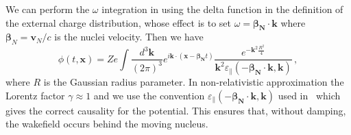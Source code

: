We can perform the $\omega$ integration in  using the delta function in the definition of the external charge distribution, whose effect is to set $\omega = \boldsymbol{\beta_{\text{N}}}\cdot \boldsymbol{k}$ where $\boldsymbol{\beta}_N = \boldsymbol{v}_N/c$ is the nuclei velocity. Then we have
\begin{equation}\label{eq:potentk}
 \phi(t,\boldsymbol{x}) = Ze\int \frac{d^3\boldsymbol{k}}{(2\pi)^3} e^{ i\boldsymbol{k}\cdot(\boldsymbol{x}-\boldsymbol{\beta_{\text{N}}} t)} \frac{ e^{-\boldsymbol{k}^2\frac{R^2}{4}}}{\boldsymbol{k}^2\varepsilon_\parallel(-\boldsymbol{\beta_{\text{N}}} \cdot \boldsymbol{k},\boldsymbol{k}) }\,,
\end{equation}
where $R$ is the Gaussian radius parameter.
In non-relativistic approximation the Lorentz factor $\gamma \approx 1$ and we use the convention $\varepsilon_\parallel(-\boldsymbol{\beta_{\text{N}}} \cdot \boldsymbol{k},\boldsymbol{k})$ used in~\cite{Montgomery:1970jpp,Stenflo:1973,Shukla:2002ppcf,Shukla:1996ccc} which gives the correct causality for the potential. This ensures that, without damping, the wakefield occurs behind the moving nucleus.

